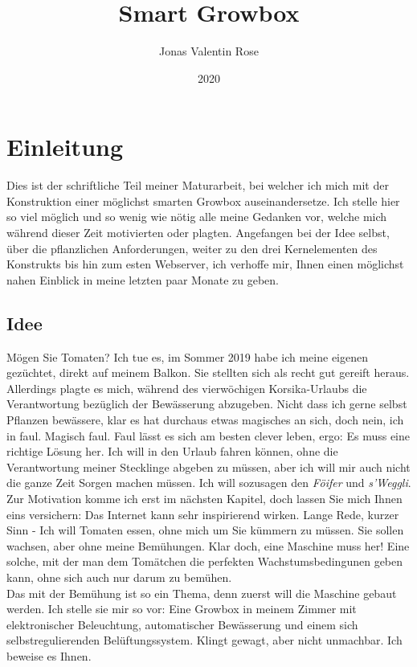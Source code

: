 \documentclass[12pt,titlepage,a4paper]{article}
\begin{document}
\begin{titlepage}
\title{Smart Growbox}
\date{2020}
\author{Jonas Valentin Rose}
\end{titlepage}
\maketitle 
\tableofcontents
\newpage
\section{Einleitung}
Dies ist der schriftliche Teil meiner Maturarbeit, bei welcher ich mich  mit der Konstruktion einer möglichst smarten Growbox auseinandersetze. Ich stelle hier so viel möglich und so wenig wie nötig alle meine Gedanken vor, welche mich während dieser Zeit motivierten oder plagten. Angefangen bei der Idee selbst, über die pflanzlichen Anforderungen, weiter zu den drei Kernelementen des Konstrukts bis hin zum esten Webserver, ich verhoffe mir, Ihnen einen möglichst nahen Einblick in meine letzten paar Monate zu geben.

\subsection{Idee}
Mögen Sie Tomaten? Ich tue es, im Sommer 2019 habe ich meine eigenen gezüchtet, direkt auf meinem Balkon. Sie stellten sich als recht gut gereift heraus. Allerdings plagte es mich, während des vierwöchigen Korsika-Urlaubs die Verantwortung bezüglich der Bewässerung abzugeben. Nicht dass ich gerne selbst Pflanzen bewässere, klar es hat durchaus etwas magisches an sich, doch nein, ich in faul. Magisch faul. Faul lässt es sich am besten clever leben, ergo: Es muss eine richtige Lösung her. Ich will in den Urlaub fahren können, ohne die Verantwortung meiner Stecklinge abgeben zu müssen, aber ich will mir auch nicht die ganze Zeit Sorgen machen müssen. Ich will sozusagen den \textit{Föifer} und \textit{s'Weggli}. Zur Motivation komme ich erst im nächsten Kapitel, doch lassen Sie mich Ihnen eins versichern: Das Internet kann sehr inspirierend wirken. Lange Rede, kurzer Sinn - Ich will Tomaten essen, ohne mich um Sie kümmern zu müssen. Sie sollen wachsen, aber ohne meine Bemühungen. Klar doch, eine Maschine muss her! Eine solche, mit der man dem Tomätchen die perfekten Wachstumsbedingunen geben kann, ohne sich auch nur darum zu bemühen. \\ Das mit der Bemühung ist so ein Thema, denn zuerst will die Maschine gebaut werden. Ich stelle sie mir so vor: Eine Growbox in meinem Zimmer mit elektronischer Beleuchtung, automatischer Bewässerung und einem sich selbstregulierenden Belüftungssystem. Klingt gewagt, aber nicht unmachbar. Ich beweise es Ihnen.
\end{document}
